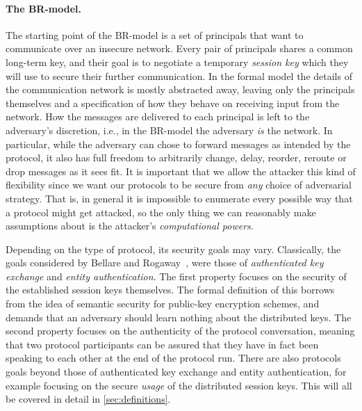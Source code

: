 \paragraph{The BR-model.}
The starting point of the BR-model is a set of principals that want to communicate over an insecure network.
Every pair of principals shares a common long-term key,
and their goal is to negotiate a temporary \emph{session key} which they will use to secure their further communication.
In the formal model the details of the communication network is mostly abstracted away,
leaving only the principals themselves and a specification of how they behave on receiving input from the network.
How the messages are delivered to each principal is left to the adversary's discretion,
i.e., in the BR-model the adversary \emph{is} the network.
In particular,
while the adversary can chose to forward messages as intended by the protocol,
it also has full freedom to arbitrarily change, delay, reorder, reroute or  drop messages as it sees fit.
It is important that we allow the attacker this kind of flexibility since we want our protocols to be secure from \emph{any} choice of adversarial strategy.
That is,
in general it is impossible to enumerate every possible way that a protocol might get attacked,
so the only thing we can reasonably make assumptions about is the attacker's \emph{computational powers}.

Depending on the type of protocol,
its security goals may vary.
Classically,
the goals considered by Bellare and Rogaway~\cite{C:BelRog93},
were those of \emph{authenticated key exchange} and \emph{entity authentication}.
The first property focuses on the security of the established session keys themselves.
The formal definition of this borrows from the idea of semantic security for public-key encryption schemes,
and demands that an adversary should learn nothing about the distributed keys.
The second property focuses on the authenticity of the protocol conversation,
meaning that two protocol participants can be assured that they have in fact been speaking to each other at the end of the protocol run.
There are also protocols goals beyond those of authenticated key exchange and entity authentication,
for example focusing on the secure \emph{usage} of the distributed session keys.
This will all be covered in  detail in \cref{sec:definitions}.



